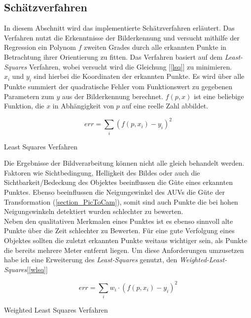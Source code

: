 \subsection{Schätzverfahren}
\label{sec_curveFit}
In diesem Abschnitt wird das implementierte Schätzverfahren erläutert. Das Verfahren nutzt die Erkenntnisse der Bilderkennung und versucht mithilfe der Regression ein Polynom $f$ zweiten Grades durch alle erkannten Punkte in Betrachtung ihrer Orientierung zu fitten.
Das Verfahren basiert auf dem \textit{Least-Squares} Verfahren\cite{simon2006optimal}, wobei versucht wird die Gleichung [\ref{lsq}] zu minimieren.\\
$x_i$ und $y_i$ sind hierbei die Koordinaten der erkannten Punkte. Es wird über alle Punkte summiert der quadratische Fehler vom Funktionswert zu gegebenen Parametern zum $y$ aus der Bilderkennung berechnet. $f(p,x)$ ist eine beliebige Funktion, die $x$ in Abhängigkeit von $p$ auf eine reelle Zahl abbildet.\\
\begin{ownequation}[H]
\begin{equation}
err = \sum_{i}(f(p,x_i)-y_i)^2
\end{equation}
\caption{Least Squares Verfahren}
\label{lsq}
\end{ownequation}
Die Ergebnisse der Bildverarbeitung können nicht alle gleich behandelt werden. Faktoren wie Sichtbedingung, Helligkeit des Bildes oder auch die Sichtbarkeit/Bedeckung des Objektes beeinflussen die Güte eines erkannten Punktes. Ebenso beeinflussen die Neigungswinkel des AUVs die Güte der Transformation (\ref{section_PicToCam}), somit sind auch Punkte die bei hohen Neigungswinkeln detektiert wurden schlechter zu bewerten.\\
Neben den qualitativen Merkmalen eines Punktes ist es ebenso sinnvoll alte Punkte über die Zeit schlechter zu Bewerten. Für eine gute Verfolgung eines Objektes sollten die zuletzt erkannten Punkte weitaus wichtiger sein, als Punkte die bereits mehrere Meter entfernt liegen.
Um diese Anforderungen umzusetzen habe ich eine Erweiterung des \textit{Least-Squares} genutzt, den \textit{Weighted-Least-Squares}[\ref{wlsq}]\\
\begin{ownequation}[H]
\begin{equation}
err = \sum_{i}w_i \cdot (f(p,x_i)-y_i)^2
\end{equation}
\caption{Weighted Least Squares Verfahren}
\label{wlsq}
\end{ownequation}

